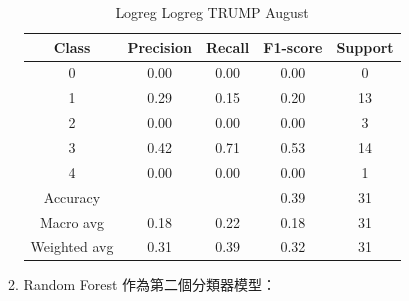 \begin{enumerate}
\begin{enumerate}
\begin{table}[H]
                \vspace{1em} %
                
                \scriptsize
                \begin{tabular}{c|cccc}
                \hline
                Class & Precision & Recall & F1-score & Support \\
                \hline
                0 & 0.00 & 0.00 & 0.00 & 0 \\
                1 & 0.29 & 0.15 & 0.20 & 13 \\
                2 & 0.00 & 0.00 & 0.00 & 3 \\
                3 & 0.42 & 0.71 & 0.53 & 14 \\
                4 & 0.00 & 0.00 & 0.00 & 1 \\
                \hline
                Accuracy &       &      & 0.39 & 31 \\
                Macro avg & 0.18 & 0.22 & 0.18 & 31 \\
                Weighted avg & 0.31 & 0.39 & 0.32 & 31 \\
                \hline
                \end{tabular}
                \caption{Logreg Logreg TRUMP August}
                \label{tab:classifier_2_report_logreg_logreg_trump_non_filtered_aug}
                \end{table}


                \pagebreak
    
                \item Random Forest 作為第二個分類器模型：


\end{enumerate}
\end{enumerate}
